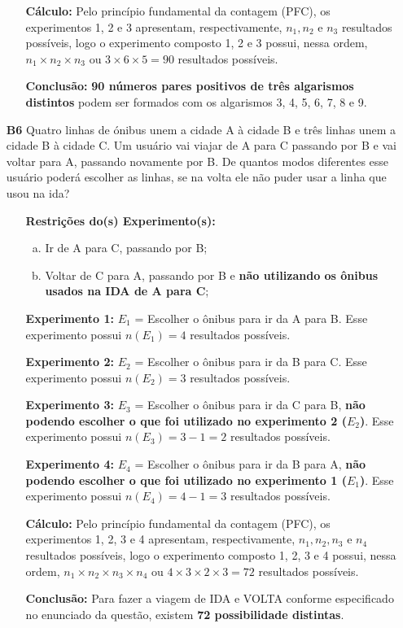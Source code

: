\documentclass[a4paper,12pt]{article}
\begin{document}
\begin{enumerate}
\begin{itemize}
     \item[\ding{177}] \textbf{Cálculo:} Pelo princípio fundamental da contagem (PFC), os experimentos 1, 2 e 3 apresentam, respectivamente, $n_{1}, n_{2} \textrm{ e } n_{3}$ resultados possíveis, logo o experimento composto 1, 2 e 3 possui, nessa ordem, $n_{1} \times n_{2} \times n_{3}$ ou $3 \times 6 \times 5 = 90$ resultados possíveis.
     \item[\ding{178}] \textbf{Conclusão:} \textbf{90 números pares positivos de três algarismos distintos} podem ser formados com os algarismos 3, 4, 5, 6, 7, 8 e 9. 
   \end{itemize}

\item[\textbf{B6}] Quatro linhas de ónibus unem a cidade A à cidade B e três linhas unem a cidade B à cidade C. Um usuário vai viajar de A para C passando por B e vai voltar para A, passando novamente por B. De quantos modos diferentes esse usuário poderá escolher as linhas, se na volta ele não puder usar a linha que usou na ida? 

 \begin{itemize}
     \item[\ding{172}] \textbf{Restrições do(s) Experimento(s):}
        \begin{enumerate}[a)]
          \item Ir de A para C, passando por B;
          \item Voltar de C para A, passando por B e \textbf{não utilizando os ônibus usados na IDA de A para C};
        \end{enumerate}
     \item[\ding{173}] \textbf{Experimento 1:} $E_1$ = Escolher o ônibus para ir da A para B. Esse experimento possui $n(E_1) = 4$ resultados possíveis.
     \item[\ding{174}] \textbf{Experimento 2:} $E_2$ = Escolher o ônibus para ir da B para C. Esse experimento possui $n(E_2) = 3$ resultados possíveis.
     \item[\ding{175}] \textbf{Experimento 3:} $E_3$ = Escolher o ônibus para ir da C para B, \textbf{não podendo escolher o que foi utilizado no experimento 2 ($E_2$)}. Esse experimento possui $n(E_3) = 3 - 1 = 2$ resultados possíveis.
     \item[\ding{176}] \textbf{Experimento 4:} $E_4$ = Escolher o ônibus para ir da B para A, \textbf{não podendo escolher o que foi utilizado no experimento 1 ($E_1$)}. Esse experimento possui $n(E_4) = 4 - 1 = 3$ resultados possíveis.    
     \item[\ding{177}] \textbf{Cálculo:} Pelo princípio fundamental da contagem (PFC), os experimentos 1, 2, 3 e 4 apresentam, respectivamente, $n_{1}, n_{2}, n_{3} \textrm{ e } n_{4}$ resultados possíveis, logo o experimento composto 1, 2, 3 e 4 possui, nessa ordem, $n_{1} \times n_{2} \times n_{3} \times n_{4}$ ou $4 \times 3 \times 2 \times 3 = 72$ resultados possíveis.
     \item[\ding{178}] \textbf{Conclusão:} Para fazer a viagem de IDA e VOLTA conforme especificado no enunciado da questão, existem \textbf{72 possibilidade distintas}.
   \end{itemize}


\end{enumerate}
\end{document}
